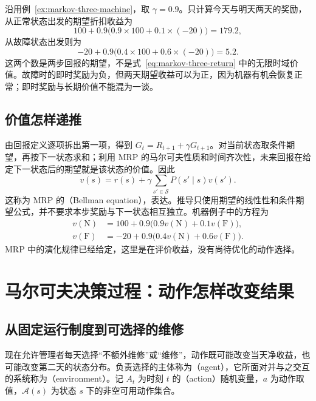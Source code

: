 \documentclass[UTF8]{ctexart}
\begin{document}
\begin{example}[两天收益与一步收益的区别]
沿用例~\ref{ex:markov-three-machine}，取 $\gamma=0.9$。只计算今天与明天两天的奖励，从正常状态出发的期望折扣收益为
\[
  100+0.9\bigl(0.9\times100+0.1\times(-20)\bigr)=179.2,
\]
从故障状态出发则为
\[
  -20+0.9\bigl(0.4\times100+0.6\times(-20)\bigr)=5.2.
\]
这两个数是两步回报的期望，不是式~\eqref{eq:markov-three-return} 中的无限时域价值。故障时的即时奖励为负，但两天期望收益可以为正，因为机器有机会恢复正常；即时奖励与长期价值不能混为一谈。
\end{example}

\subsection{价值怎样递推}

由回报定义逐项拆出第一项，得到 $G_t=R_{t+1}+\gamma G_{t+1}$。对当前状态取条件期望，再按下一状态求和；利用 MRP 的马尔可夫性质和时间齐次性，未来回报在给定下一状态后的期望就是该状态的价值。因此
\begin{equation}
  v(s)=r(s)+\gamma\sum_{s'\in\mathcal S}P(s'\mid s)v(s').
  \label{eq:markov-three-mrp-bellman}
\end{equation}
这称为 MRP 的（Bellman equation），表达。推导只使用期望的线性性和条件期望公式，并不要求本步奖励与下一状态相互独立。机器例子中的方程为
\[
  \begin{aligned}
    v(\mathrm N)&=100+0.9\bigl(0.9v(\mathrm N)+0.1v(\mathrm F)\bigr),\\
    v(\mathrm F)&=-20+0.9\bigl(0.4v(\mathrm N)+0.6v(\mathrm F)\bigr).
  \end{aligned}
\]
MRP 中的演化规律已经给定，这里是在评价收益，没有尚待优化的动作选择。

\section{马尔可夫决策过程：动作怎样改变结果}
\label{sec:markov-three-mdp}

\subsection{从固定运行制度到可选择的维修}

现在允许管理者每天选择“不额外维修”或“维修”，动作既可能改变当天净收益，也可能改变第二天的状态分布。负责选择的主体称为（agent），它所面对并与之交互的系统称为（environment）。记 $A_t$ 为时刻 $t$ 的（action）随机变量，$a$ 为动作取值，$\mathcal A(s)$ 为状态 $s$ 下的非空可用动作集合。
\end{document}
